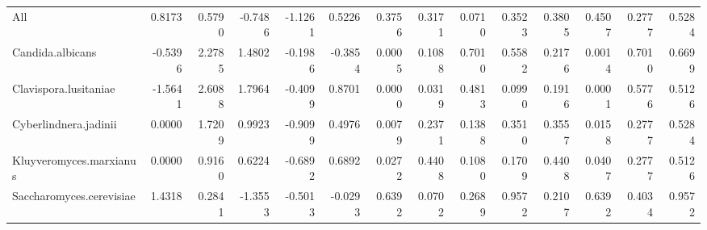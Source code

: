 {\begin{landscape}
\begin{longtable}{ | l | r | r | r | r | r | r  | r | r | r | r | r | r  | r  |}
			
		All & 0.8173 & 0.5790 & -0.7486 & -1.1261 & 0.5226 & 0.3756 & 0.3171 & 0.0710 & 0.3523 & 0.3805 & 0.4507 & 0.2777 & 0.5284 \\ Candida.albicans & -0.5396 & 2.2785 & 1.4802 & -0.1986 & -0.3854 & 0.0005 & 0.1088 & 0.7010 & 0.5582 & 0.2176 & 0.0014 & 0.7010 & 0.6699 \\ Clavispora.lusitaniae & -1.5641 & 2.6088 & 1.7964 & -0.4099 & 0.8701 & 0.0000 & 0.0319 & 0.4813 & 0.0990 & 0.1916 & 0.0001 & 0.5776 & 0.5126 \\ Cyberlindnera.jadinii & 0.0000 & 1.7209 & 0.9923 & -0.9099 & 0.4976 & 0.0079 & 0.2371 & 0.1388 & 0.3510 & 0.3557 & 0.0158 & 0.2777 & 0.5284 \\ Kluyveromyces.marxianus & 0.0000 & 0.9160 & 0.6224 & -0.6892 & 0.6892 & 0.0272 & 0.4408 & 0.1080 & 0.1709 & 0.4408 & 0.0407 & 0.2777 & 0.5126 \\ Saccharomyces.cerevisiae & 1.4318 & 0.2841 & -1.3553 & -0.5013 & -0.0293 & 0.6392 & 0.0702 & 0.2689 & 0.9572 & 0.2107 & 0.6392 & 0.4034 & 0.9572
			
		\end{longtable}
	\end{landscape}
}




